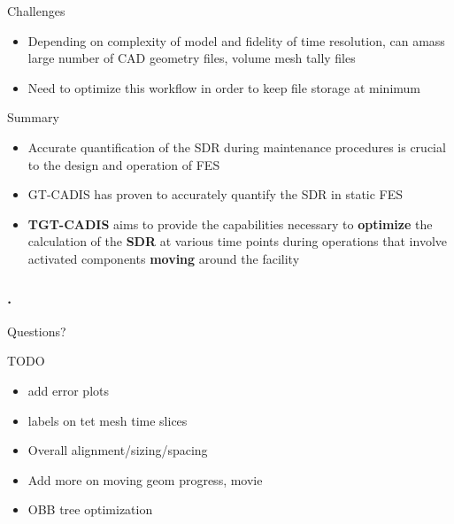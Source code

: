 \documentclass{beamer}
\begin{document}
\begin{frame}{Challenges}
			\begin{itemize}
				\item{Depending on complexity of model and
					fidelity of time resolution, can amass
					large number of CAD geometry files,
					volume mesh tally files}
				\item{Need to optimize this workflow in order
					to keep file storage at minimum}
			\end{itemize}
\end{frame}
\begin{frame}{Summary}
	\begin{itemize}
		\item{Accurate quantification of the SDR during maintenance
			procedures is crucial to the design and operation of
			FES}
		\item{GT-CADIS has proven to accurately quantify the SDR in
			static FES}
\vspace{0.5cm}
		\item{\textbf{TGT-CADIS} aims to provide the capabilities necessary to
			\textbf{optimize} the calculation of the \textbf{SDR} at various time points during
			operations that involve activated components \textbf{moving}
			around the facility}
	\end{itemize}
\end{frame}

\begin{frame}[c]
	\frametitle{\tiny{.}}
	\begin{center}
	{\Huge Questions?}
	\end{center}
\end{frame}

\begin{frame}{TODO}
	\begin{itemize}
		\item{add error plots}
		\item{labels on tet mesh time slices}
		\item{Overall alignment/sizing/spacing}
		\item{Add more on moving geom progress, movie}
		\item{OBB tree optimization}
	\end{itemize}
\end{frame}
\end{document}
